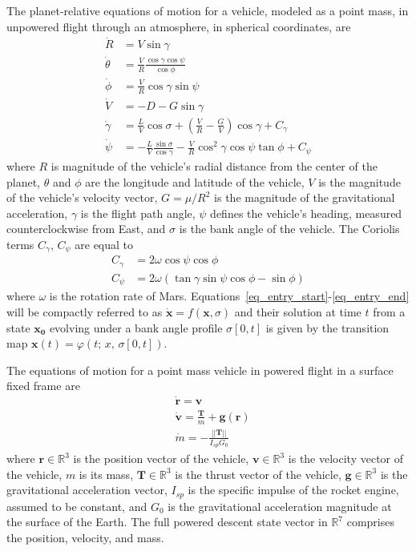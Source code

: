 \documentclass[letterpaper, preprint, paper,11pt]{AAS}
\begin{document}
The planet-relative equations of motion for a vehicle, modeled as a point mass, in unpowered flight through an atmosphere, in spherical coordinates, are
\begin{align}
\dot{R} &= V\sin\gamma \label{eq_entry_start}\\
\dot{\theta} &= \frac{V}{R}\frac{\cos\gamma\cos\psi}{\cos\phi}\\
\dot{\phi} &= \frac{V}{R}\cos\gamma\sin\psi \\
\dot{V} &= -D - G\sin\gamma \\
\dot{\gamma} &= \frac{L}{V}\cos\sigma + (\frac{V}{R}-\frac{G}{V})\cos\gamma + C_{\gamma}\\
\dot{\psi} &= -\frac{L}{V}\frac{\sin\sigma}{\cos\gamma} - \frac{V}{R}\cos^2\gamma\cos\psi\tan\phi + C_{\psi}\label{eq_entry_end}
\end{align}
where $R$ is magnitude of the vehicle's radial distance from the center of the planet, $\theta$ and $\phi$ are the longitude and latitude of the vehicle, $V$ is the magnitude of the vehicle's velocity vector,  $G=\mu/R^2$ is the magnitude of the gravitational acceleration, $\gamma$ is the flight path angle, $\psi$ defines the vehicle's heading, measured counterclockwise from East, and $\sigma$ is the bank angle of the vehicle. The Coriolis terms $C_{\gamma},\,C_{\psi}$ are equal to
\begin{align}
C_{\gamma} &= 2\omega\cos\psi\cos\phi \\
C_{\psi} &= 2\omega(\tan\gamma\sin\psi\cos\phi-\sin\phi)
\end{align}
where $\omega$ is the rotation rate of Mars. Equations~\ref{eq_entry_start}-\ref{eq_entry_end} will be compactly referred to as $\dot{\mathbf{x}} = f(\mathbf{x},\sigma)$ and their solution at time $t$ from a state $\mathbf{x_0}$ evolving under a bank angle profile $\sigma[0,t]$ is given by the transition map $\mathbf{x}(t) = \varphi(t;\, x,\,\sigma[0,t])$.

The equations of motion for a point mass vehicle in powered flight in a surface fixed frame are
\begin{align}
&\dot{\mathbf{r}} = \mathbf{v} \label{eq_eom_srp} \\
&\dot{\mathbf{v}} = \frac{\mathbf{T}}{m} + \mathbf{g}(\mathbf{r}) \\
&\dot{m} = -\frac{||\mathbf{T}||}{I_{sp}G_0} \label{eq_eom_srp_end}
\end{align}
where $\mathbf{r}\in\mathbb{R}^3$ is the position vector of the vehicle, $\mathbf{v}\in\mathbb{R}^3$ is the velocity vector of the vehicle, $m$ is its mass, $\mathbf{T}\in\mathbb{R}^3$ is the thrust vector of the vehicle, $\mathbf{g}\in\mathbb{R}^3$ is the gravitational acceleration vector, $I_{sp}$ is the specific impulse of the rocket engine, assumed to be constant, and $G_0$ is the gravitational acceleration magnitude at the surface of the Earth. The full powered descent state vector in $\mathbb{R}^7$ comprises the position, velocity, and mass. 
\end{document}
